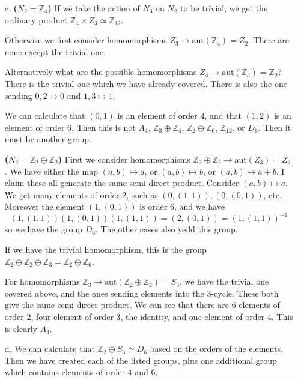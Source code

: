 \documentclass[12pt, reqno]{article}
\theoremstyle{plain}
\theoremstyle{definition}
\theoremstyle{remark}
\newcommand{\ZZ}{\mathbb{Z}}
\begin{document}
\begin{enumerate}
\begin{enumerate}
        \item[c.] \textbf{($N_2 = \ZZ_4$)} If we take the action of $N_3$ on $N_2$ to be trivial, we get the 
        ordinary product $\ZZ_4 \times Z_3 \simeq \ZZ_{12}$. 

        Otherwise we first consider homomorphisms $Z_3 \rightarrow \text{aut}(\ZZ_4) = Z_2$. There are none 
        except the trivial one. 

        Alternatively what are the possible homomorphisms $Z_4 \rightarrow \text{aut}(\ZZ_3) = \ZZ_2$? 
        There is the trivial one which we have already covered. There is also the one sending $0, 2 \mapsto 0$
        and $1, 3 \mapsto 1$. 

        We can calculate that $(0,1)$ is an element of order $4$, and that $(1,2)$ is an element of order $6$. 
        Then this is not $A_4$, $\ZZ_3 \oplus \ZZ_4$, $\ZZ_2\oplus \ZZ_6$, $\ZZ_{12}$, or $D_6$. Then it must be another
        group.

        \textbf{($N_2 = \ZZ_2 \oplus \ZZ_2$)} First we consider homomorphisms $\ZZ_2 \oplus \ZZ_2 \rightarrow \text{aut}(Z_3)
        = Z_2$. We have either the map $(a,b) \mapsto a$, or $(a,b) \mapsto b$, or $(a,b)\mapsto a+b$. I claim 
        these all generate the same semi-direct product. Consider $(a,b) \mapsto a$. We get many elements of 
        order $2$, such as $(0,(1,1)), (0, (0,1))$, etc. Moreover the element $(1, (0,1))$ is order $6$, and we have
        \[
            (1,(1,1))(1,(0,1))(1,(1,1)) = (2,(0,1)) = (1,(1,1))^{-1}
        \]
        so we have the group $D_6$. The other cases also yeild this group.

        If we have the trivial homomorphism, this is the group $\ZZ_2 \oplus \ZZ_2 \oplus \ZZ_3 = \ZZ_2\oplus \ZZ_6$.

        For homomorphisms $\ZZ_3 \rightarrow \text{aut}(\ZZ_2\oplus \ZZ_2) = S_3$, we have the trivial one covered above,
        and the ones sending elements into the $3$-cycle. These both give the same semi-direct product. We can 
        see that there are $6$ elements of order $2$, four element of order $3$, the identity, and one element 
        of order $4$. This is clearly $A_4$. 

        \item[d.] We can calculate that $\ZZ_2 \oplus S_3 \simeq D_6$ based on the orders of the elements. Then 
        we have created each of the listed groups, plus one additional group which contains elements of order $4$ 
        and $6$. 
    \end{enumerate}
    

\end{enumerate}
\end{document}
